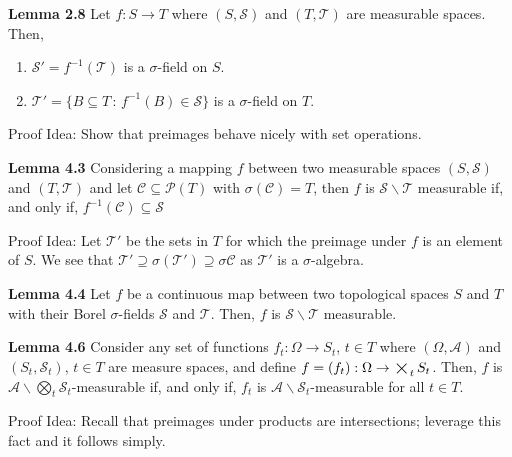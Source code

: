 \documentclass[10pt]{article}
\renewenvironment{proof}[1][]{\vspace{-16pt}\begin{proofBox}}{\end{proofBox}\vspace{4pt}}
\newenvironment{lemma}[1][]{\begin{theoremBox}{#1}}{\end{theoremBox}\vspace{4pt}}
\newcommand{\col}{\, :\, }
\renewcommand{\cal}[1]{\mathcal{#1}}
\newcommand{\bigtimes}{\mathop{\scalebox{1.5}{\raisebox{-0.2ex}{$\times$}}}}
\let\cal\mathcal
\begin{document}
\begin{lemma}[\textbf{Lemma 2.8}]
    Let $f : S \to T$ where $(S, \cal{S})$ and $(T, \cal{T})$ are measurable spaces. Then,
    \begin{enumerate}
        \item $\cal{S}' = f^{-1}(\cal{T})$ is a $\sigma$-field on $S$.
        \item $\cal{T}' = \{B \subseteq T \col f^{-1}(B) \in \cal{S}\}$ is a $\sigma$-field on $T$. 
    \end{enumerate}
\end{lemma}
\begin{proof}{Proof Idea:}
    Show that preimages behave nicely with set operations.
\end{proof}

\begin{lemma}[\textbf{Lemma 4.3}]
    Considering a mapping $f$ between two measurable spaces $(S, \cal{S})$ and $(T, \cal{T})$ and let $\cal{C} \subseteq \cal{P}(T)$ with $\sigma(\cal{C}) = T$, then $f$ is $\cal{S}\backslash \cal{T}$ measurable if, and only if, $f^{-1}(\cal{C}) \subseteq \cal{S}$
\end{lemma}
\begin{proof}{Proof Idea:}
    Let $\cal{T'}$ be the sets in $T$ for which the preimage under $f$ is an element of $S$. We see that $\cal{T'} \supseteq \sigma(\cal{T'}) \supseteq \sigma{\cal{C}}$ as $\cal{T'}$ is a $\sigma$-algebra.
\end{proof}

\begin{lemma}[\textbf{Lemma 4.4}]
    Let $f$ be a continuous map between two topological spaces $S$ and $T$ with their Borel $\sigma$-fields $\cal{S}$ and $\cal{T}$. Then, $f$ is $\cal{S} \backslash \cal{T}$ measurable.
\end{lemma}

\begin{lemma}[\textbf{Lemma 4.6}]
    Consider any set of functions $f_{t} : \Omega \to S_{t}$, $t \in T$ where $(\Omega, \cal{A})$ and $(S_{t}, \cal{S}_{t})$, $t \in T$ are measure spaces, and define $f = (f_{t}) : \Omega \to \bigtimes_{t} S_{t}$. Then, $f$ is $\cal{A} \backslash \bigotimes_{t} \cal{S}_{t}$-measurable if, and only if, $f_{t}$ is $\cal{A} \backslash \cal{S}_{t}$-measurable for all $t \in T$. 
\end{lemma}
\begin{proof}{Proof Idea:}
    Recall that preimages under products are intersections; leverage this fact and it follows simply.
\end{proof}
\end{document}
